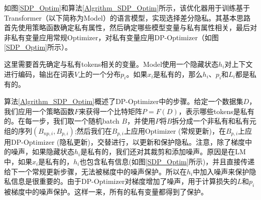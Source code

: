 如图\ref{SDP_Optim}和算法\ref{Algrithm_SDP_Optim}所示，该优化器用于训练基于Transformer（以下简称为Model）的语言模型，实现选择差分隐私。其基本思路首先使用策略函数确定私有属性，然后确定哪些模型变量与私有属性相关，最后对非私有变量应用常规Optimizer，对私有变量应用DP-Optimizer（如图\ref{SDP_Optim}所示）。

这里需要首先确定与私有tokens相关的变量。Model使用一个隐藏状态$h_i$对上下文进行编码，输出在词表$V$上的一个分布$p_i$。如果$x_i$是私有的，那么$h_i$、$p_i$和$L_i$都是私有的。

算法\ref{Algrithm_SDP_Optim}概述了DP-Optimizer中的步骤。给定一个数据集$D$，我们应用一个策略函数$F$来获得一个比特矩阵$P=F(D)$，表示哪些tokens是私有的。在每一步，我们取一个随机batch $B$，并使用$P$将$B$拆分成一个非私有和私有元组的序列${(B_{np,i},B_{p,i})}$;然后我们在$B_{p,i}$上应用Optimizer (常规更新)，在$B_{p,i}$上应用DP-Optimizer (隐私更新)，交替进行，以更新和保护隐私。注意，除了梯度中的噪声，如果隐藏状态$h_i$是私有的，我们还对其裁剪和添加噪声。原因是在LM中，如果$x_i$是私有的，$h_i$也包含私有信息(如图\ref{SDP_Optim}所示)，并且直接传递给下一个常规更新步骤，无法被梯度中的噪声保护。所以在$h_i$中加入噪声来保护隐私信息是很重要的。由于DP-Optimizer对梯度增加了噪声，用于计算损失的$L$和$p_i$被梯度中的噪声保护。这样一来，所有的私有变量都得到了保护。






%	
%	
%		
%		
%		
%		
%			
%			
%			
%			
%			
%			
%			
%			
%			
%			
%			
%			
%			
%			
%			
%			
%			
%			
%			
%		
%	

